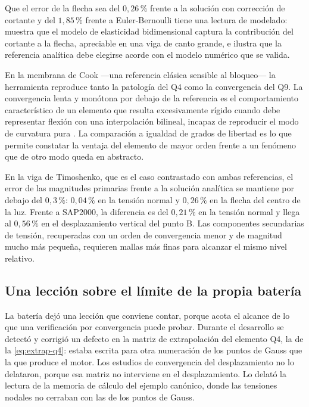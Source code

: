 Que el error de la flecha sea del $0{,}26\,\%$ frente a la solución con corrección de cortante y del $1{,}85\,\%$ frente a Euler-Bernoulli tiene una lectura de modelado: muestra que el modelo de elasticidad bidimensional captura la contribución del cortante a la flecha, apreciable en una viga de canto grande, e ilustra que la referencia analítica debe elegirse acorde con el modelo numérico que se valida.

En la membrana de Cook —una referencia clásica sensible al bloqueo— la herramienta reproduce tanto la patología del Q4 como la convergencia del Q9. La convergencia lenta y monótona por debajo de la referencia es el comportamiento característico de un elemento que resulta excesivamente rígido cuando debe representar flexión con una interpolación bilineal, incapaz de reproducir el modo de curvatura pura \autocites[pp.~98-99]{cook2002concepts}[p.~476]{bathe2014fem}. La comparación a igualdad de grados de libertad es lo que permite constatar la ventaja del elemento de mayor orden frente a un fenómeno que de otro modo queda en abstracto.

En la viga de Timoshenko, que es el caso contrastado con ambas referencias, el error de las magnitudes primarias frente a la solución analítica se mantiene por debajo del $0{,}3\,\%$: $0{,}04\,\%$ en la tensión normal y $0{,}26\,\%$ en la flecha del centro de la luz. Frente a SAP2000, la diferencia es del $0{,}21\,\%$ en la tensión normal y llega al $0{,}56\,\%$ en el desplazamiento vertical del punto B. Las componentes secundarias de tensión, recuperadas con un orden de convergencia menor y de magnitud mucho más pequeña, requieren mallas más finas para alcanzar el mismo nivel relativo.

\subsection{Una lección sobre el límite de la propia batería}
\label{sec:leccion-extrapolacion}

La batería dejó una lección que conviene contar, porque acota el alcance de lo que una verificación por convergencia puede probar. Durante el desarrollo se detectó y corrigió un defecto en la matriz de extrapolación del elemento Q4, la de la \autoref{eq:extrap-q4}: estaba escrita para otra numeración de los puntos de Gauss que la que produce el motor. Los estudios de convergencia del desplazamiento no lo delataron, porque esa matriz no interviene en el desplazamiento. Lo delató la lectura de la memoria de cálculo del ejemplo canónico, donde las tensiones nodales no cerraban con las de los puntos de Gauss.


